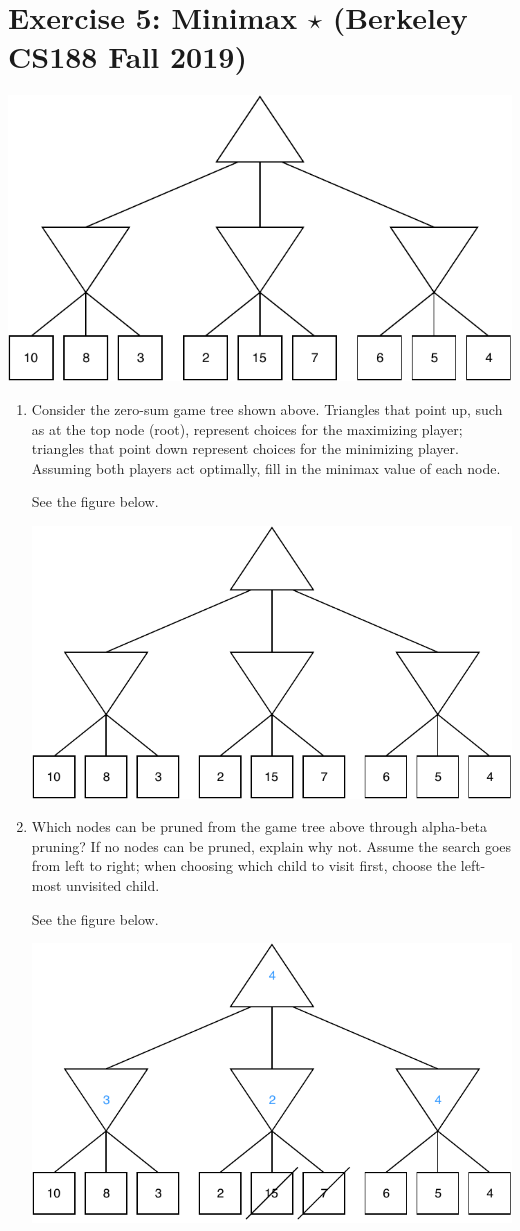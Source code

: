 \documentclass[9pt,a4paper]{extarticle}
\newenvironment{solution}
    {%
    \color{red}
    }
    { 
    \color{black}
    }
\begin{document}
\section*{Exercise 5: Minimax $\star$ (Berkeley CS188 Fall 2019)}
\begin{center}
    \includegraphics[width=.6\textwidth]{figures/minimax.pdf}
\end{center}
\begin{enumerate}
    \item Consider the zero-sum game tree shown above. Triangles that point up, such as at the top node (root), represent choices for the maximizing player; triangles that point down represent choices for the minimizing player. Assuming both players act optimally, fill in the minimax value of each node.
    \begin{solution}
    See the figure below.
    \begin{center}
        \includegraphics[width=.7\textwidth]{figures/minimax.pdf}
    \end{center}
    \end{solution}
    \item Which nodes can be pruned from the game tree above through alpha-beta pruning? If no nodes can be pruned, explain why not. Assume the search goes from left to right; when choosing which child to visit first, choose the left-most unvisited child.
    \begin{solution}
    See the figure below.
    \begin{center}
        \includegraphics[width=.7\textwidth]{figures/minimax_sol_1.pdf}

\end{center}
\end{solution}
\end{enumerate}
\end{document}

